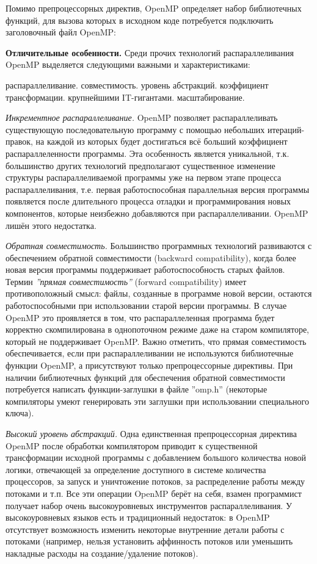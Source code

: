Помимо препроцессорных директив, OpenMP определяет набор библиотечных функций, для вызова которых в исходном коде потребуется подключить заголовочный файл OpenMP:

\textbf{Отличительные особенности.} Среди прочих технологий распараллеливания OpenMP выделяется следующими важными и характеристиками:

\begin{itemize}
     распараллеливание.
     совместимость.
     уровень абстракций.
     коэффициент трансформации.
     крупнейшими IT-гигантами. 
     масштабирование.
\end{itemize}

\textit{Инкрементное распараллеливание.}  OpenMP позволяет распараллеливать существующую последовательную программу с помощью небольших итераций-правок, на каждой из которых будет достигаться всё больший коэффициент распараллеленности программы. Эта особенность является уникальной, т.к. большинство других технологий предполагают существенное изменение структуры распараллеливаемой программы уже на первом этапе процесса распараллеливания, т.е. первая работоспособная параллельная версия программы появляется после длительного процесса отладки и программирования новых компонентов, которые неизбежно добавляются при распараллеливании. OpenMP лишён этого недостатка.

\textit{Обратная совместимость.} Большинство программных технологий развиваются с обеспечением обратной совместимости (back\-ward com\-pat\-i\-bil\-i\-ty), когда более новая версия программы поддерживает работоспособность старых файлов. Термин \textit{''прямая совместимость''} (forward compatibility) имеет противоположный смысл: файлы, созданные в программе новой версии, остаются работоспособными при использовании старой версии программы. В случае OpenMP это проявляется в том, что распараллеленная программа будет корректно скомпилирована в однопоточном режиме даже на старом компиляторе, который не поддерживает OpenMP. Важно отметить, что прямая совместимость обеспечивается, если при распараллеливании не используются библиотечные функции OpenMP, а присутствуют только препроцессорные директивы. При наличии библиотечных функций для обеспечения обратной совместимости потребуется написать функции-заглушки в файле ''omp.h'' (некоторые компиляторы умеют генерировать эти заглушки при использовании специального ключа).

\textit{Высокий уровень абстракций.} Одна единственная препроцессорная директива OpenMP после обработки компилятором приводит к существенной трансформации исходной программы с добавлением большого количества новой логики, отвечающей за определение доступного в системе количества процессоров, за запуск и уничтожение потоков, за распределение работы между потоками и т.п. Все эти операции OpenMP берёт на себя, взамен программист получает набор очень высокоуровневых инструментов распараллеливания. У высокоуровневых языков есть и традиционный недостаток: в OpenMP отсутствует возможность изменить некоторые внутренние детали работы с потоками (например, нельзя установить аффинность потоков или уменьшить накладные расходы на создание/удаление потоков).

